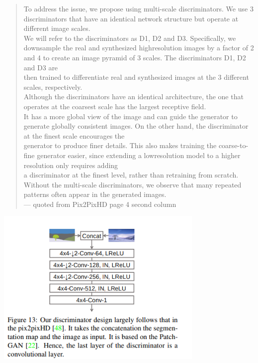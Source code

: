\documentclass[a4paper, dvipdfmx, 10pt]{article}
\begin{document}
\begin{quote}
To address the issue, we propose using multi-scale discriminators. We use 3 discriminators that have an identical network structure but operate at different image scales.\\
We will refer to the discriminators as D1, D2 and D3. Specifically, we downsample the real and synthesized highresolution images by a factor of 2 and 4 to create an image pyramid of 3 scales. The discriminators D1, D2 and D3 are\\
then trained to differentiate real and synthesized images at the 3 different scales, respectively.\\
Although the discriminators have an identical architecture, the one that operates at the coarsest scale has the largest receptive field.\\
It has a more global view of the image and can guide the generator to generate globally consistent images. On the other hand, the discriminator at the finest scale encourages the\\
generator to produce finer details. This also makes training the coarse-to-fine generator easier, since extending a lowresolution model to a higher resolution only requires adding\\
a discriminator at the finest level, rather than retraining from scratch.\\
Without the multi-scale discriminators, we observe that many repeated patterns often appear in the generated images.\\

--- quoted from Pix2PixHD page 4 second column\\
\end{quote}
\begin{center}
\includegraphics[width=10cm]{./gaugan_disc.png}
\end{center}
\end{document}
